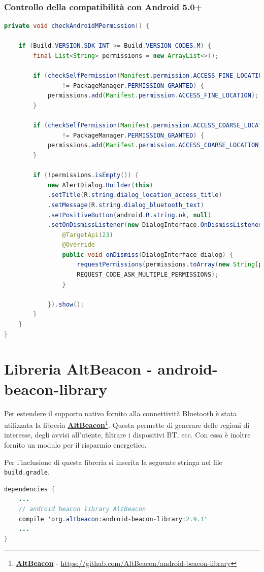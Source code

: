 \subsubsection{Controllo della compatibilità con Android 5.0+}
\begin{lstlisting}[language=Java]
private void checkAndroidMPermission() {
   	
   	if (Build.VERSION.SDK_INT >= Build.VERSION_CODES.M) {
   		final List<String> permissions = new ArrayList<>();
   		
   		if (checkSelfPermission(Manifest.permission.ACCESS_FINE_LOCATION)
		   		!= PackageManager.PERMISSION_GRANTED) {
   			permissions.add(Manifest.permission.ACCESS_FINE_LOCATION);
   		}
   		
   		if (checkSelfPermission(Manifest.permission.ACCESS_COARSE_LOCATION)
		   		!= PackageManager.PERMISSION_GRANTED) {
   			permissions.add(Manifest.permission.ACCESS_COARSE_LOCATION);
   		}
   		
   		if (!permissions.isEmpty()) {
   			new AlertDialog.Builder(this)
   			.setTitle(R.string.dialog_location_access_title)
   			.setMessage(R.string.dialog_bluetooth_text)
   			.setPositiveButton(android.R.string.ok, null)
   			.setOnDismissListener(new DialogInterface.OnDismissListener() {
   				@TargetApi(23)
   				@Override
   				public void onDismiss(DialogInterface dialog) {
   					requestPermissions(permissions.toArray(new String[permissions.size()]),
   					REQUEST_CODE_ASK_MULTIPLE_PERMISSIONS);
   				}
   				
   			}).show();
   		}
   	}
}
\end{lstlisting}

\section{Libreria AltBeacon - android-beacon-library}
Per estendere il supporto nativo fornito alla connettività Bluetooth è stata utilizzata la libreria \href{https://github.com/AltBeacon/android-beacon-library}{\textbf{AltBeacon}}\footnote{\href{https://github.com/AltBeacon/android-beacon-library}{\textbf{AltBeacon}} - \url{https://github.com/AltBeacon/android-beacon-library}}. Questa permette di generare delle regioni di interesse, degli avvisi all'utente, filtrare i dispositivi BT, ecc. Con essa è inoltre fornito un modulo per il risparmio energetico.

Per l'inclusione di questa libreria si inserita la seguente stringa nel file \texttt{build.gradle}.
\begin{lstlisting}[language=Java]
dependencies {
	...
	// android beacon library AltBeacon
	compile 'org.altbeacon:android-beacon-library:2.9.1'
	...
}
\end{lstlisting}

